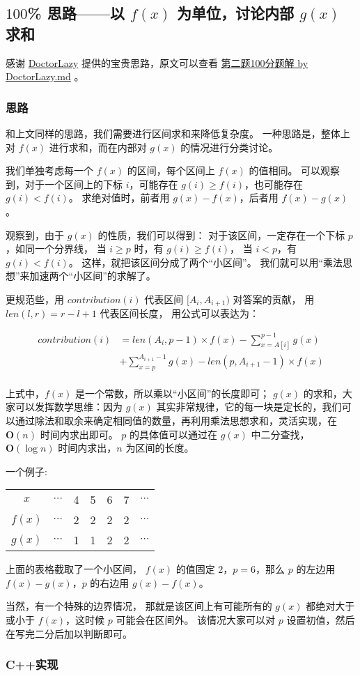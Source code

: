 \subsection{$100$\% 思路——以 $f(x)$ 为单位，讨论内部 $g(x)$ 求和}

感谢 \href{https://github.com/DoctorLazy}{DoctorLazy} 
提供的宝贵思路，原文可以查看 \href{https://github.com/DoctorLazy}{第二题100分题解 by DoctorLazy.md}
。

\subsubsection{思路}

和上文同样的思路，我们需要进行区间求和来降低复杂度。
一种思路是，整体上对 $f(x)$ 进行求和，而在内部对 $g(x)$ 的情况进行分类讨论。

我们单独考虑每一个 $f(x)$ 的区间，每个区间上 $f(x)$ 的值相同。
可以观察到，对于一个区间上的下标 $i$，可能存在 $g(i)\ge f(i)$，也可能存在 $g(i)<f(i)$。
求绝对值时，前者用 $g(x)-f(x)$，后者用 $f(x)-g(x)$。

观察到，由于 $g(x)$ {}的性质，我们可以得到：
对于该区间，一定存在一个下标 $p$，如同一个分界线，
当 $i\ge p$ 时，有 $g(i)\ge f(i)$，
当 $i<p$，有 $g(i)<f(i)$。
这样，就把该区间分成了两个“小区间”。
我们就可以用“乘法思想”来加速两个“小区间”的求解了。

更规范些，用 $contribution(i)$ 代表区间 $[A_i, A_{i+1})$ 对答案的贡献，
用 $len(l, r) = r - l + 1$ 代表区间长度， 
用公式可以表达为：

\begin{align*}
contribution(i) & =len(A_i,p-1)\times f(x)-\sum_{x=A[i]}^{p-1}g(x) \\
& +\sum_{x=p}^{A_{i+1}-1}g(x)- len(p,A_{i+1}-1)\times f(x) \\
\end{align*}

上式中，$f(x)$ 是一个常数，所以乘以“小区间”的长度即可；
$g(x)$ 的求和，大家可以发挥数学思维：因为 $g(x)$ 其实非常规律，它的每一块是定长的，我们可以通过除法和取余来确定相同值的数量，再利用乘法思想求和，灵活实现，在 $\mathbf{O}(n)$ 时间内求出即可。
$p$ 的具体值可以通过在 $g(x)$ 中二分查找，$\mathbf{O}(\log n)$ 时间内求出，$n$ 为区间的长度。

一个例子:

\begin{table}[H]
\centering
\begin{tabular}{ccccccc}
    \toprule
    $x$ & $\cdots$ & 4 & 5 & 6 & 7 & $\cdots$ \\
    $f(x)$ & $\cdots$ & 2 & 2 & 2 & 2 & $\cdots$ \\
    $g(x)$ & $\cdots$ & 1 & 1 & 2 & 2 & $\cdots$ \\
    \bottomrule
\end{tabular}
\end{table}

上面的表格截取了一个小区间，
$f(x)$ 的值固定 $2$，$p=6$，那么 $p$ 的左边用 $f(x)-g(x)$，$p$ 的右边用 $g(x)-f(x)$。

当然，有一个特殊的边界情况，
那就是该区间上有可能所有的 $g(x)$ 都绝对大于或小于 $f(x)$，这时候 $p$ 可能会在区间外。
该情况大家可以对 $p$ 设置初值，然后在写完二分后加以判断即可。

\subsubsection{C++实现}

